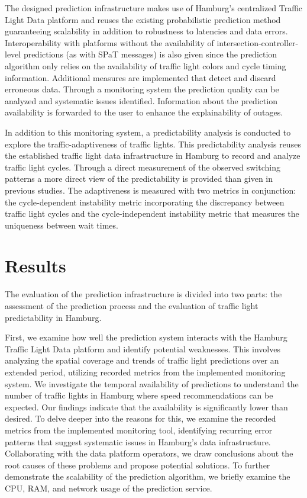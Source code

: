 \begin{Summary}
The designed prediction infrastructure makes use of Hamburg's centralized Traffic Light Data platform and reuses the existing probabilistic prediction method  \cite{pape_untersuchung_2012, protschky_extensive_2014, protschky_adaptive_2014} guaranteeing scalability in addition to robustness to latencies and data errors. Interoperability with platforms without the availability of intersection-controller-level predictions (as with SPaT messages) is also given since the prediction algorithm only relies on the availability of traffic light colors and cycle timing information. Additional measures are implemented that detect and discard erroneous data. Through a monitoring system the prediction quality can be analyzed and systematic issues identified. Information about the prediction availability is forwarded to the user to enhance the explainability of outages. 

In addition to this monitoring system, a predictability analysis is conducted to explore the traffic-adaptiveness of traffic lights. This predictability analysis reuses the established traffic light data infrastructure in Hamburg to record and analyze traffic light cycles. Through a direct measurement of the observed switching patterns a more direct view of the predictability is provided than given in previous studies. The adaptiveness is measured with two metrics in conjunction: the cycle-dependent instability metric incorporating the discrepancy between traffic light cycles and the cycle-independent instability metric that measures the uniqueness between wait times.
\end{Summary}

\section{Results}

The evaluation of the prediction infrastructure is divided into two parts: the assessment of the prediction process and the evaluation of traffic light predictability in Hamburg.

First, we examine how well the prediction system interacts with the Hamburg Traffic Light Data platform and identify potential weaknesses. This involves analyzing the spatial coverage and trends of traffic light predictions over an extended period, utilizing recorded metrics from the implemented monitoring system. We investigate the temporal availability of predictions to understand the number of traffic lights in Hamburg where speed recommendations can be expected. Our findings indicate that the availability is significantly lower than desired. To delve deeper into the reasons for this, we examine the recorded metrics from the implemented monitoring tool, identifying recurring error patterns that suggest systematic issues in Hamburg's data infrastructure. Collaborating with the data platform operators, we draw conclusions about the root causes of these problems and propose potential solutions. To further demonstrate the scalability of the prediction algorithm, we briefly examine the CPU, RAM, and network usage of the prediction service.

